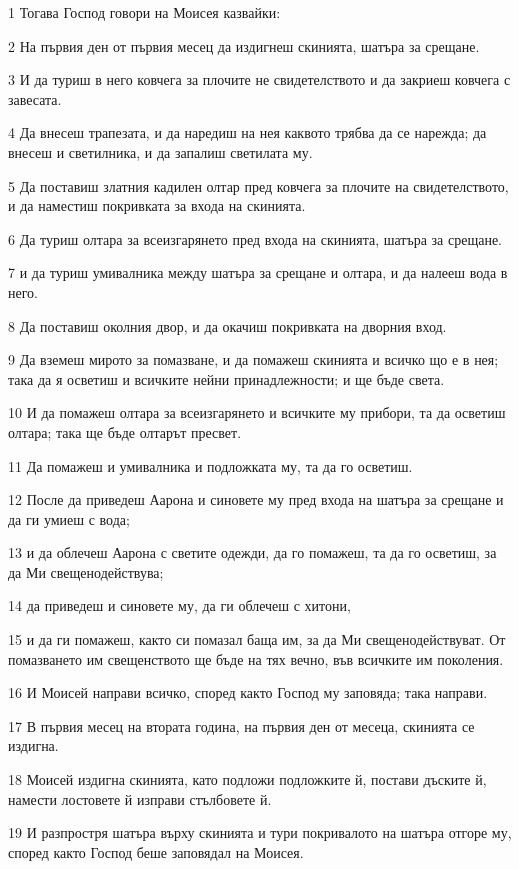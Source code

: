 \par 1 Тогава Господ говори на Моисея казвайки:
\par 2 На първия ден от първия месец да издигнеш скинията, шатъра за срещане.
\par 3 И да туриш в него ковчега за плочите не свидетелството и да закриеш ковчега с завесата.
\par 4 Да внесеш трапезата, и да наредиш на нея каквото трябва да се нарежда; да внесеш и светилника, и да запалиш светилата му.
\par 5 Да поставиш златния кадилен олтар пред ковчега за плочите на свидетелството, и да наместиш покривката за входа на скинията.
\par 6 Да туриш олтара за всеизгарянето пред входа на скинията, шатъра за срещане.
\par 7 и да туриш умивалника между шатъра за срещане и олтара, и да налееш вода в него.
\par 8 Да поставиш околния двор, и да окачиш покривката на дворния вход.
\par 9 Да вземеш мирото за помазване, и да помажеш скинията и всичко що е в нея; така да я осветиш и всичките нейни принадлежности; и ще бъде света.
\par 10 И да помажеш олтара за всеизгарянето и всичките му прибори, та да осветиш олтара; така ще бъде олтарът пресвет.
\par 11 Да помажеш и умивалника и подложката му, та да го осветиш.
\par 12 После да приведеш Аарона и синовете му пред входа на шатъра за срещане и да ги умиеш с вода;
\par 13 и да облечеш Аарона с светите одежди, да го помажеш, та да го осветиш, за да Ми свещенодействува;
\par 14 да приведеш и синовете му, да ги облечеш с хитони,
\par 15 и да ги помажеш, както си помазал баща им, за да Ми свещенодействуват. От помазването им свещенството ще бъде на тях вечно, във всичките им поколения.
\par 16 И Моисей направи всичко, според както Господ му заповяда; така направи.
\par 17 В първия месец на втората година, на първия ден от месеца, скинията се издигна.
\par 18 Моисей издигна скинията, като подложи подложките й, постави дъските й, намести лостовете й изправи стълбовете й.
\par 19 И разпростря шатъра върху скинията и тури покривалото на шатъра отгоре му, според както Господ беше заповядал на Моисея.
